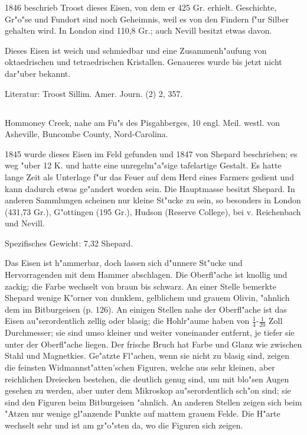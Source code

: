 \documentclass[a4paper, 11pt, oneside]{article}
\begin{document}
1846 beschrieb Troost dieses Eisen, von dem er 425 Gr. erhielt. Geschichte, Gr"o"se und Fundort sind noch Geheimnis, weil es von den Findern f"ur Silber gehalten wird. In London sind 110,8 Gr.; auch Nevill besitzt etwas davon.

Dieses Eisen ist weich und schmiedbar und eine Zusammenh"aufung von oktaedrischen und tetraedrischen Kristallen. Genaueres wurde bis jetzt nicht dar"uber bekannt.

\normalsize
Literatur: Troost Sillim. Amer. Journ. (2) 2, 357.

\subsection{}
\LARGE
\paragraph{}
Hommoney Creek, nahe am Fu"s des Pisgahberges, 10 engl. Meil. westl. von Asheville, Buncombe County, Nord-Carolina.

1845 wurde dieses Eisen im Feld gefunden und 1847 von Shepard beschrieben; es weg "uber 12 K. und hatte eine unregelm"a"sige tafelartige Gestalt. Es hatte lange Zeit als Unterlage f"ur das Feuer auf dem Herd eines Farmers gedient und kann dadurch etwas ge"andert worden sein. Die Hauptmasse besitzt Shepard. In anderen Sammlungen scheinen nur kleine St"ucke zu sein, so besonders in London (431,73 Gr.), G"ottingen (195 Gr.), Hudson (Reserve College), bei v. Reichenbach und Nevill.

Spezifisches Gewicht: 7,32 Shepard.

Das Eisen ist h"ammerbar, doch lassen sich d"unnere St"ucke und Hervorragenden mit dem Hammer abschlagen. Die Oberfl"ache ist knollig und zackig; die Farbe wechselt von braun bis schwarz. An einer Stelle bemerkte Shepard wenige K"orner von dunklem, gelblichem und grauem Olivin, "ahnlich dem im Bitburgeisen (p. 126). An einigen Stellen nahe der Oberfl"ache ist das Eisen au"serordentlich zellig oder blasig; die Hohlr"aume haben von $\mathfrak{\frac{1}{4}}$-$\mathfrak{\frac{1}{20}}$ Zoll Durchmesser; sie sind umso kleiner und weiter voneinander entfernt, je tiefer sie unter der Oberfl"ache liegen. Der frische Bruch hat Farbe und Glanz wie zwischen Stahl und Magnetkies. Ge"atzte Fl"achen, wenn sie nicht zu blasig sind, zeigen die feinsten Widmannst"atten'schen Figuren, welche aus sehr kleinen, aber reichlichen Dreiecken bestehen, die deutlich genug sind, um mit blo"sen Augen gesehen zu werden, aber unter dem Mikroskop au"serordentlich sch"on sind; sie sind den Figuren beim Bitburgeisen "ahnlich. An anderen Stellen zeigen sich beim "Atzen nur wenige gl"anzende Punkte auf mattem grauem Felde. Die H"arte wechselt sehr und ist am gr"o"sten da, wo die Figuren sich zeigen.
\end{document}
